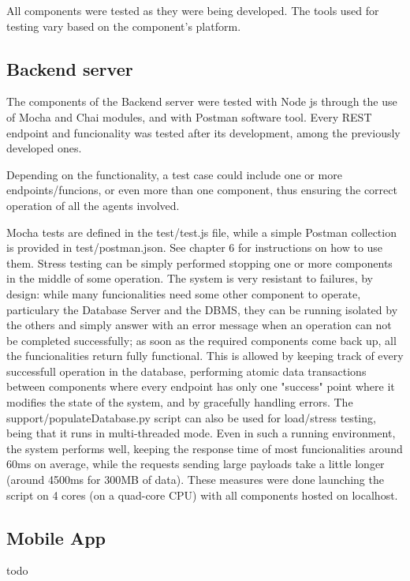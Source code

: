 \documentclass[../main.tex]{subfiles}
\begin{document}
All components were tested as they were being developed. The tools used for testing vary based on the component's platform.

\subsection{Backend server}

The components of the Backend server were tested with Node js through the use of Mocha and Chai modules, and with Postman software tool. Every REST endpoint and funcionality was tested after its development, among the previously developed ones.

Depending on the functionality, a test case could include one or more endpoints/funcions, or even more than one component, thus ensuring the correct operation of all the agents involved.

Mocha tests are defined in the test/test.js file, while a simple Postman collection is provided in test/postman.json. See chapter 6 for instructions on how to use them.
\newline
\newline
Stress testing can be simply performed stopping one or more components in the middle of some operation. The system is very resistant to failures, by design: while many funcionalities need some other component to operate, particulary the Database Server and the DBMS, they can be running isolated by the others and simply answer with an error message when an operation can not be completed successfully; as soon as the required components come back up, all the funcionalities return fully functional. This is allowed by keeping track of every successfull operation in the database, performing atomic data transactions between components where every endpoint has only one "success" point where it modifies the state of the system, and by gracefully handling errors.
\newline
\newline
The support/populateDatabase.py script can also be used for load/stress testing, being that it runs in multi-threaded mode. Even in such a running environment, the system performs well, keeping the response time of most funcionalities around 60ms on average, while the requests sending large payloads take a little longer (around 4500ms for 300MB of data). These measures were done launching the script on 4 cores (on a quad-core CPU) with all components hosted on localhost.

\subsection{Mobile App}

todo
\end{document}
